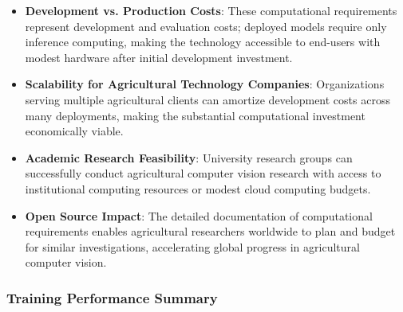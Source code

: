 \begin{itemize}
    \item \textbf{Development vs. Production Costs}: These computational requirements represent development and evaluation costs; deployed models require only inference computing, making the technology accessible to end-users with modest hardware after initial development investment.
    
    \item \textbf{Scalability for Agricultural Technology Companies}: Organizations serving multiple agricultural clients can amortize development costs across many deployments, making the substantial computational investment economically viable.
    
    \item \textbf{Academic Research Feasibility}: University research groups can successfully conduct agricultural computer vision research with access to institutional computing resources or modest cloud computing budgets.
    
    \item \textbf{Open Source Impact}: The detailed documentation of computational requirements enables agricultural researchers worldwide to plan and budget for similar investigations, accelerating global progress in agricultural computer vision.
\end{itemize}

\subsubsection{Training Performance Summary}

\begin{table}[H]
\centering
\caption{Training Time and Performance Summary (Corrected)}
\label{tab:training_performance_corrected}
\end{table}


